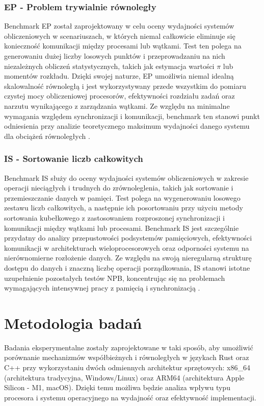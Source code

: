 \subsubsection{EP - Problem trywialnie równoległy}
Benchmark EP  został zaprojektowany w celu oceny wydajności systemów obliczeniowych w scenariuszach, w których niemal całkowicie eliminuje się konieczność komunikacji między procesami lub wątkami. Test ten polega na generowaniu dużej liczby losowych punktów i przeprowadzaniu na nich niezależnych obliczeń statystycznych, takich jak estymacja wartości $\pi$ lub momentów rozkładu. Dzięki swojej naturze, EP umożliwia niemal idealną skalowalność równoległą i jest wykorzystywany przede wszystkim do pomiaru czystej mocy obliczeniowej procesorów, efektywności rozdziału zadań oraz narzutu wynikającego z zarządzania wątkami. Ze względu na minimalne wymagania względem synchronizacji i komunikacji, benchmark ten stanowi punkt odniesienia przy analizie teoretycznego maksimum wydajności danego systemu dla obciążeń równoległych \cite{nasaParallelBenchmarks}.

\subsubsection{IS - Sortowanie liczb całkowitych}
Benchmark IS  służy do oceny wydajności systemów obliczeniowych w zakresie operacji nieciągłych i trudnych do zrównoleglenia, takich jak sortowanie i przemieszczanie danych w pamięci. Test polega na wygenerowaniu losowego zestawu liczb całkowitych, a następnie ich posortowaniu przy użyciu metody sortowania kubełkowego  z zastosowaniem rozproszonej synchronizacji i komunikacji między wątkami lub procesami. Benchmark IS jest szczególnie przydatny do analizy przepustowości podsystemów pamięciowych, efektywności komunikacji w architekturach wieloprocesorowych oraz odporności systemu na nierównomierne rozłożenie danych. Ze względu na swoją nieregularną strukturę dostępu do danych i znaczną liczbę operacji porządkowania, IS stanowi istotne uzupełnienie pozostałych testów NPB, koncentrując się na problemach wymagających intensywnej pracy z pamięcią i synchronizacją \cite{nasaParallelBenchmarks}.

\section{Metodologia badań}
Badania eksperymentalne zostały zaprojektowane w taki sposób, aby umożliwić porównanie mechanizmów współbieżnych i równoległych w językach Rust oraz C++ przy wykorzystaniu dwóch odmiennych architektur sprzętowych: x86\_64 (architektura tradycyjna, Windows/Linux) oraz ARM64 (architektura Apple Silicon - M1, macOS). Dzięki temu możliwa będzie analiza wpływu typu procesora i systemu operacyjnego na wydajność oraz efektywność implementacji.


